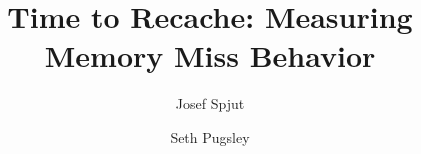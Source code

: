 \documentclass[times, 10pt, twocolumn]{article}
\begin{document}
\title{Time to Recache: Measuring Memory Miss Behavior}

\author{Josef Spjut \and Seth Pugsley}
\date{}

\maketitle

\begin{abstract}

\end{abstract}













\end{document}
